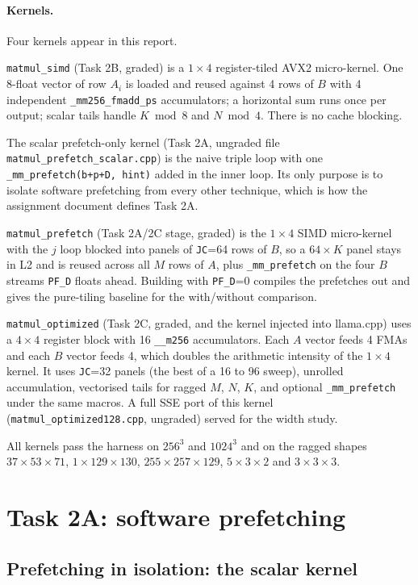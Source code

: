 \documentclass[11pt,a4paper]{article}
\begin{document}
\paragraph{Kernels.} Four kernels appear in this report.

\texttt{matmul\_simd} (Task 2B, graded) is a $1\times4$ register-tiled AVX2 micro-kernel. One 8-float vector of row $A_i$ is loaded and reused against 4 rows of $B$ with 4 independent \texttt{\_mm256\_fmadd\_ps} accumulators; a horizontal sum runs once per output; scalar tails handle $K \bmod 8$ and $N \bmod 4$. There is no cache blocking.

The scalar prefetch-only kernel (Task 2A, ungraded file \texttt{matmul\_prefetch\_scalar.cpp}) is the naive triple loop with one \texttt{\_mm\_prefetch(b+p+D, hint)} added in the inner loop. Its only purpose is to isolate software prefetching from every other technique, which is how the assignment document defines Task 2A.

\texttt{matmul\_prefetch} (Task 2A/2C stage, graded) is the $1\times4$ SIMD micro-kernel with the $j$ loop blocked into panels of \texttt{JC}=64 rows of $B$, so a $64\times K$ panel stays in L2 and is reused across all $M$ rows of $A$, plus \texttt{\_mm\_prefetch} on the four $B$ streams \texttt{PF\_D} floats ahead. Building with \texttt{PF\_D}=0 compiles the prefetches out and gives the pure-tiling baseline for the with/without comparison.

\texttt{matmul\_optimized} (Task 2C, graded, and the kernel injected into llama.cpp) uses a $4\times4$ register block with 16 \texttt{\_\_m256} accumulators. Each $A$ vector feeds 4 FMAs and each $B$ vector feeds 4, which doubles the arithmetic intensity of the $1\times4$ kernel. It uses \texttt{JC}=32 panels (the best of a 16 to 96 sweep), unrolled accumulation, vectorised tails for ragged $M$, $N$, $K$, and optional \texttt{\_mm\_prefetch} under the same macros. A full SSE port of this kernel (\texttt{matmul\_optimized128.cpp}, ungraded) served for the width study.

All kernels pass the harness on $256^3$ and $1024^3$ and on the ragged shapes $37\times53\times71$, $1\times129\times130$, $255\times257\times129$, $5\times3\times2$ and $3\times3\times3$.

\section{Task 2A: software prefetching}

\subsection{Prefetching in isolation: the scalar kernel}
\end{document}
